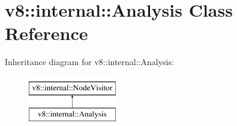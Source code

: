 \hypertarget{classv8_1_1internal_1_1Analysis}{}\section{v8\+:\+:internal\+:\+:Analysis Class Reference}
\label{classv8_1_1internal_1_1Analysis}
Inheritance diagram for v8\+:\+:internal\+:\+:Analysis\+:\begin{figure}[H]
\begin{center}
\leavevmode
\includegraphics[height=2.000000cm]{classv8_1_1internal_1_1Analysis}
\end{center}
\end{figure}

